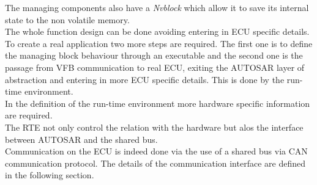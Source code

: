 \documentclass[../main.tex]{subfiles}
\begin{document}
The managing components also have a \textit{Nvblock} which allow it to save its internal state to the non volatile memory. \\
The whole function design can be done avoiding entering in \gls{ECU} specific details. To create a real application two more steps are required. The first one is to define the managing block behaviour through an executable and the second one is the passage from \gls{VFB} communication to real \gls{ECU}, exiting the \gls{AUTOSAR} layer of abstraction and entering in more \gls{ECU} specific details. This is done by the run-time environment.\\
In the definition of the run-time environment more hardware specific information are required.\\ The \gls{RTE} not only control the relation with the hardware but alos the interface between \gls{AUTOSAR} and the shared \gls{bus}.\\
Communication on the ECU is indeed done via the use of a shared \gls{bus} via \gls{CAN} communication protocol. The details of the communication interface are defined in the following section.
\end{document}
